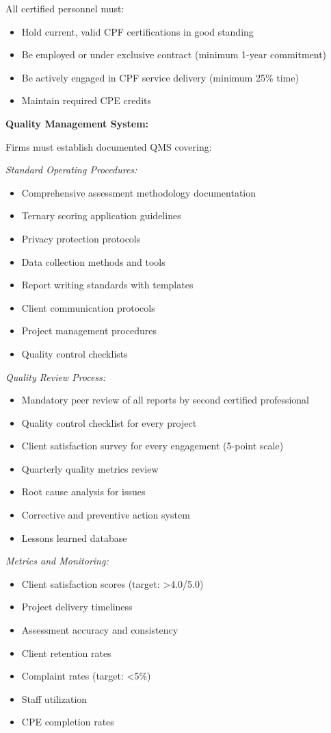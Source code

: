 \documentclass[11pt,a4paper]{article}
\begin{document}
All certified personnel must:
\begin{itemize}
\item Hold current, valid CPF certifications in good standing
\item Be employed or under exclusive contract (minimum 1-year commitment)
\item Be actively engaged in CPF service delivery (minimum 25\% time)
\item Maintain required CPE credits
\end{itemize}

\textbf{Quality Management System:}

Firms must establish documented QMS covering:

\textit{Standard Operating Procedures:}
\begin{itemize}
\item Comprehensive assessment methodology documentation
\item Ternary scoring application guidelines
\item Privacy protection protocols
\item Data collection methods and tools
\item Report writing standards with templates
\item Client communication protocols
\item Project management procedures
\item Quality control checklists
\end{itemize}

\textit{Quality Review Process:}
\begin{itemize}
\item Mandatory peer review of all reports by second certified professional
\item Quality control checklist for every project
\item Client satisfaction survey for every engagement (5-point scale)
\item Quarterly quality metrics review
\item Root cause analysis for issues
\item Corrective and preventive action system
\item Lessons learned database
\end{itemize}

\textit{Metrics and Monitoring:}
\begin{itemize}
\item Client satisfaction scores (target: >4.0/5.0)
\item Project delivery timeliness
\item Assessment accuracy and consistency
\item Client retention rates
\item Complaint rates (target: <5\%)
\item Staff utilization
\item CPE completion rates
\end{itemize}
\end{document}
